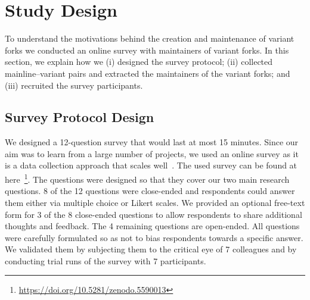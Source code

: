 \section{Study Design}
\label{sec:study_design}

To understand the motivations behind the creation and maintenance of variant forks we conducted an online survey with maintainers of variant forks. In this section, we explain how we (i) designed the survey protocol; (ii) collected mainline--variant pairs and extracted the maintainers of the variant forks; and (iii) recruited the survey participants.


\subsection{Survey Protocol Design}
\label{sec:protocal}

We designed a 12-question survey that would last at most 15 minutes.
Since our aim was to learn from a large number of projects, we used an online survey as it is a data collection approach that scales well~\cite{Flick:2014}.
The used survey can be found at here~\footnote{\url{https://doi.org/10.5281/zenodo.5590013}}.
The questions were designed so that they cover our two main research questions.
8 of the 12 questions were close-ended and respondents could answer them either via multiple choice or Likert scales.
We provided an optional free-text form for 3 of the 8 close-ended questions to allow respondents to share additional thoughts and feedback.
The 4 remaining questions are open-ended.
All questions were carefully formulated so as not to bias respondents towards a specific answer. We validated them by subjecting them to the critical eye of 7 colleagues and by conducting trial runs of the survey with 7 participants.%

